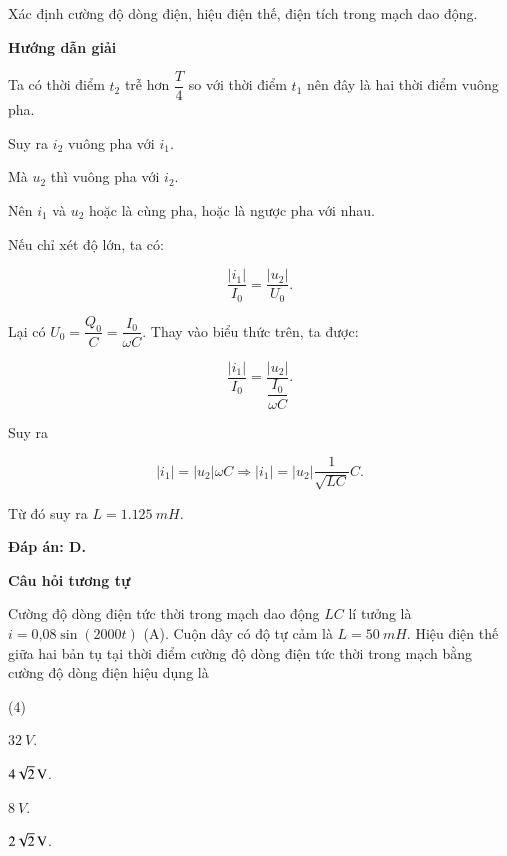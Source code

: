\begin{dang}{Xác định cường độ dòng điện, hiệu điện thế, điện tích trong mạch dao động.}
	{	\begin{center}
			\textbf{Hướng dẫn giải}
		\end{center}
		
		Ta có thời điểm $t_2$ trễ hơn $\dfrac{T}{4}$ so với thời điểm $t_1$ nên đây là hai thời điểm vuông pha. 
		
		Suy ra $i_2$ vuông pha với $i_1$. 
		
		Mà $u_2$ thì vuông pha với $i_2$. 
		
		Nên $i_1$ và $u_2$ hoặc là cùng pha, hoặc là ngược pha với nhau. 
		
		Nếu chỉ xét độ lớn, ta có:
		
		$$\dfrac{|i_1|}{I_0} = \dfrac{|u_2|}{U_0}.$$ 
		
		Lại có $U_0 = \dfrac{Q_0}{C} = \dfrac{I_0}{\omega C}$. Thay vào biểu thức trên, ta được:
		
		$$\dfrac{|i_1|}{I_0} = \dfrac{|u_2|}{\dfrac{I_0}{\omega C}}.$$
		
		Suy ra 
		
		$$|i_1| = |u_2|\omega C \Rightarrow |i_1| = |u_2|\dfrac{1}{\sqrt{LC}} C.$$
		
		Từ đó suy ra $L = \SI{1,125}{mH}.$
		
		\textbf{Đáp án: D.}
		
		\begin{center}
			\textbf{Câu hỏi tương tự}
		\end{center}
		
		Cường độ dòng điện tức thời trong mạch dao động $LC$ lí tưởng là $i = \text{0,08} \sin \left( 2000t \right)$ (A). Cuộn dây có độ tự cảm là $L = \SI{50}{mH}$. Hiệu điện thế giữa hai bản tụ tại thời điểm cường độ dòng điện tức thời trong mạch bằng cường độ dòng điện hiệu dụng là
		\begin{mcq}(4)
			\item $\SI{32}{V}$. 
			\item $\xsi{4\sqrt{2}}{V}$. 
			\item $\SI{8}{V}$. 
			\item $\xsi{2\sqrt{2}}{V}$. 
		\end{mcq}
		
}
\end{dang}

